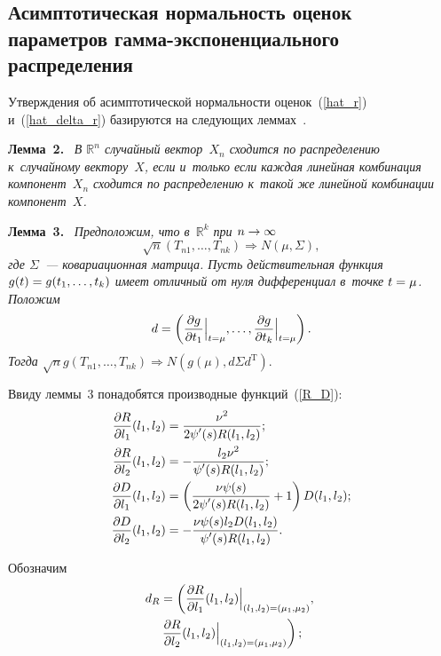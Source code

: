 \begin{multicols}{2}
\section{Асимптотическая нормальность оценок параметров гамма-экспоненциального 
распределения}

Утверждения об асимп\-то\-ти\-че\-ской нор\-маль\-ности оценок~(\ref{hat_r}) и~(\ref{hat_delta_r}) 
базируются на сле\-ду\-ющих леммах~\cite{Serfling2002}.

\smallskip

\noindent
\textbf{Лемма~2.}\
\textit{В $\mathbb{R}^n$ случайный вектор~$X_n$ сходится по рас\-пре\-де\-ле\-нию к~случайному 
век\-то\-ру~$X$, если и~только если каж\-дая линейная комбинация компонент~$X_n$ 
сходится по распределению к~такой же линейной комбинации компонент~$X$.}


\smallskip

\noindent
\textbf{Лемма~3.}\
\textit{Предположим, что в~$\mathbb{R}^k$ при $n\hm\to\infty$}
$$
\sqrt{n}(T_{n1},\ldots,T_{nk})\Longrightarrow N\left(\mu, \Sigma\right),
$$
\textit{где $\Sigma$~--- ковариационная мат\-ри\-ца. Пусть действительная функция 
$g(t)\hm=g(t_1,\ldots,t_k)$ имеет от\-лич\-ный от нуля дифференциал в~точ\-ке $t\hm=\mu$. 
По\-ложим}
$$
d=\left(\displaystyle\frac{\displaystyle \partial g\mathstrut}{\displaystyle \partial t_1\mathstrut}\Big|_{t=\mu},\ldots,
\displaystyle\frac{\displaystyle \partial g\mathstrut}{\displaystyle \partial t_k\mathstrut}\Big|_{t=\mu}\right).
$$
\textit{Тогда $\sqrt{n}g(T_{n1},\ldots,T_{nk})\Longrightarrow N(g(\mu), d\Sigma d^{\mathrm{T}})$}.

\smallskip


Ввиду леммы~3 понадобятся производные функ\-ций~(\ref{R_D}):
\begin{align*}
\fr{\partial R}{\partial l_1}(l_1,l_2)&=
\fr{\nu^2}{2 \psi'(s) R(l_1,l_2)};
\\ %
\fr{\partial R}{\partial l_2}(l_1,l_2)&=
-\fr{l_2 \nu^2}{\psi'(s) R(l_1,l_2)};
\\ %
\fr{\partial D}{\partial l_1}(l_1,l_2)&=
\left(\fr{\nu\psi(s) }{2 \psi'(s) R(l_1,l_2)}+1\right)D(l_1,l_2);
\\ %
\fr{\partial D}{\partial l_2}(l_1,l_2)&=
-\fr{\nu\psi(s)l_2D(l_1,l_2)}{\psi'(s) R(l_1,l_2)}.
\end{align*}

Обозначим
\begin{multline}
d_{R}=\left(\displaystyle\frac{\displaystyle \partial R\mathstrut}{\displaystyle \partial l_1\mathstrut}(l_1,l_2)\Big|_{(l_1,l_2)=(\mu_1,\mu_2)},\right.\\
\left. \displaystyle\frac{\displaystyle \partial R\mathstrut}{\displaystyle \partial l_2\mathstrut}(l_1,l_2)\Big|_{(l_1,l_2)=(\mu_1,\mu_2)}\right);
\label{d_R_pm}
\end{multline}


\end{multicols}
